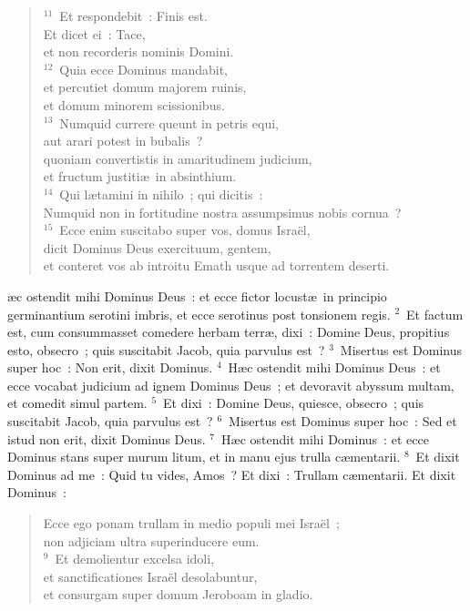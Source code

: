 \begin{flushleft}
\begin{verse}
${}^{11}$~Et respondebit~: Finis est.\\ Et dicet ei~: Tace,\\ et non recorderis nominis Domini.\\
${}^{12}$~Quia ecce Dominus mandabit,\\ et percutiet domum majorem ruinis,\\ et domum minorem scissionibus.\\
${}^{13}$~Numquid currere queunt in petris equi,\\ aut arari potest in bubalis~?\\ quoniam convertistis in amaritudinem judicium,\\ et fructum justiti\ae\ in absinthium.\\
${}^{14}$~Qui l\ae tamini in nihilo~; qui dicitis~:\\ Numquid non in fortitudine nostra assumpsimus nobis cornua~?\\
${}^{15}$~Ecce enim suscitabo super vos, domus Isra\"el,\\ dicit Dominus Deus exercituum, gentem,\\ et conteret vos ab introitu Emath usque ad torrentem deserti.\end{verse}\end{flushleft}



\bchapter
{}\ae c ostendit mihi Dominus Deus~: et ecce fictor locust\ae\ in principio germinantium serotini imbris, et ecce serotinus post tonsionem regis.
${}^{2}$~Et factum est, cum consummasset comedere herbam terr\ae , dixi~: Domine Deus, propitius esto, obsecro~; quis suscitabit Jacob, quia parvulus est~?
${}^{3}$~Misertus est Dominus super hoc~: Non erit, dixit Dominus.
${}^{4}$~H\ae c ostendit mihi Dominus Deus~: et ecce vocabat judicium ad ignem Dominus Deus~; et devoravit abyssum multam, et comedit simul partem.
${}^{5}$~Et dixi~: Domine Deus, quiesce, obsecro~; quis suscitabit Jacob, quia parvulus est~?
${}^{6}$~Misertus est Dominus super hoc~: Sed et istud non erit, dixit Dominus Deus.
${}^{7}$~H\ae c ostendit mihi Dominus~: et ecce Dominus stans super murum litum, et in manu ejus trulla c\ae mentarii.
${}^{8}$~Et dixit Dominus ad me~: Quid tu vides, Amos~? Et dixi~: Trullam c\ae mentarii. Et dixit Dominus~: \begin{flushleft}\begin{verse}Ecce ego ponam trullam in medio populi mei Isra\"el~;\\ non adjiciam ultra superinducere eum.\\
${}^{9}$~Et demolientur excelsa idoli,\\ et sanctificationes Isra\"el desolabuntur,\\ et consurgam super domum Jeroboam in gladio.\end{verse}\end{flushleft}


